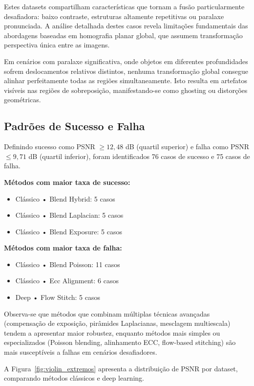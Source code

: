 Estes datasets compartilham características que tornam a fusão particularmente desafiadora: baixo contraste, estruturas altamente repetitivas ou paralaxe pronunciada. A análise detalhada destes casos revela limitações fundamentais das abordagens baseadas em homografia planar global, que assumem transformação perspectiva única entre as imagens.

Em cenários com paralaxe significativa, onde objetos em diferentes profundidades sofrem deslocamentos relativos distintos, nenhuma transformação global consegue alinhar perfeitamente todas as regiões simultaneamente. Isto resulta em artefatos visíveis nas regiões de sobreposição, manifestando-se como ghosting ou distorções geométricas.

\subsection{Padrões de Sucesso e Falha}

Definindo sucesso como PSNR $\geq 12{,}48$ dB (quartil superior) e falha como PSNR $\leq 9{,}71$ dB (quartil inferior), foram identificados 76 casos de sucesso e 75 casos de falha.

\textbf{Métodos com maior taxa de sucesso:}
\begin{itemize}
    \item Clássico • Blend Hybrid: 5 casos
    \item Clássico • Blend Laplacian: 5 casos
    \item Clássico • Blend Exposure: 5 casos
\end{itemize}

\textbf{Métodos com maior taxa de falha:}
\begin{itemize}
    \item Clássico • Blend Poisson: 11 casos
    \item Clássico • Ecc Alignment: 6 casos
    \item Deep • Flow Stitch: 5 casos
\end{itemize}

Observa-se que métodos que combinam múltiplas técnicas avançadas (compensação de exposição, pirâmides Laplacianas, mesclagem multiescala) tendem a apresentar maior robustez, enquanto métodos mais simples ou especializados (Poisson blending, alinhamento ECC, flow-based stitching) são mais susceptíveis a falhas em cenários desafiadores.

A Figura~\ref{fig:violin_extremos} apresenta a distribuição de PSNR por dataset, comparando métodos clássicos e deep learning.

